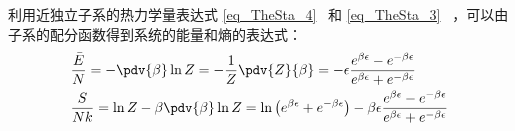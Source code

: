 利用近独立子系的热力学量表达式 \autoref{eq_TheSta_4}~ 和 \autoref{eq_TheSta_3}~ ，可以由子系的配分函数得到系统的能量和熵的表达式：
\begin{equation}
\begin{aligned}
&\frac{\bar E}{N}=-\pdv{\beta} \ln Z=-\frac{1}{Z}\pdv{Z}{\beta}
=-\epsilon\frac{e^{\beta\epsilon}-e^{-\beta\epsilon}}{e^{\beta\epsilon}+e^{-\beta\epsilon}}\\
&\frac{S}{Nk}
=\ln Z-\beta\pdv{\beta} \ln Z=
\ln \left(e^{\beta\epsilon}+e^{-\beta\epsilon}\right)-
\beta\epsilon \frac{e^{\beta\epsilon}-e^{-\beta\epsilon}}{e^{\beta\epsilon}+e^{-\beta\epsilon}}
\end{aligned}
\end{equation}
